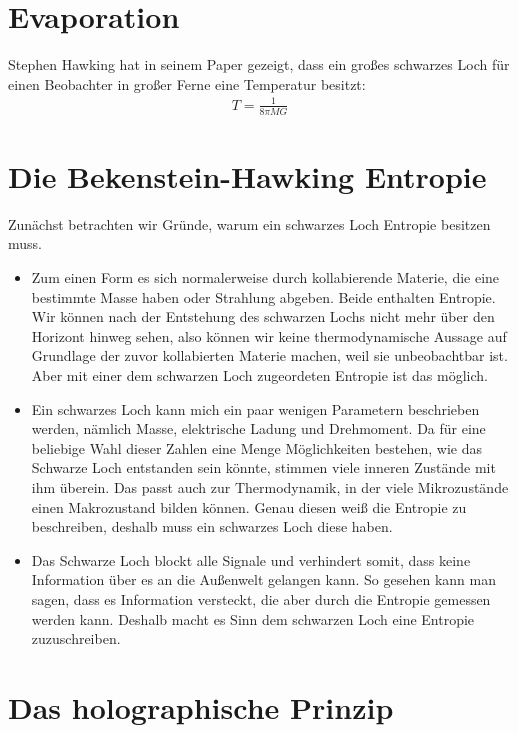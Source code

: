 \documentclass[ngerman]{scrartcl}
\begin{document}
\section{Evaporation}
	Stephen Hawking hat in seinem Paper \cite{ParticleCreation} gezeigt, dass ein großes schwarzes Loch für einen Beobachter in großer Ferne eine Temperatur besitzt:
		\begin{align}
			T = \frac{1}{8 \pi MG}
		\end{align}

\section{Die Bekenstein-Hawking Entropie}
Zunächst betrachten wir Gründe, warum ein schwarzes Loch Entropie besitzen muss. 
	\begin{itemize}
		\item Zum einen Form es sich normalerweise durch kollabierende Materie, die eine 	bestimmte Masse haben oder Strahlung abgeben. Beide enthalten 		Entropie. Wir können nach der Entstehung des schwarzen Lochs nicht mehr über den Horizont hinweg sehen, also können wir keine thermodynamische Aussage auf Grundlage der zuvor kollabierten Materie machen, weil sie unbeobachtbar ist. Aber mit einer dem schwarzen Loch zugeordeten Entropie ist das möglich.
		
		\item Ein schwarzes Loch kann mich ein paar wenigen Parametern beschrieben werden, nämlich Masse, elektrische Ladung und Drehmoment. Da für eine beliebige Wahl dieser Zahlen eine Menge Möglichkeiten bestehen, wie das Schwarze Loch entstanden sein könnte, stimmen viele inneren Zustände mit ihm überein. Das passt auch zur Thermodynamik, in der viele Mikrozustände einen Makrozustand bilden können. Genau diesen weiß die Entropie zu beschreiben, deshalb muss ein schwarzes Loch diese haben. 
		
		\item Das Schwarze Loch blockt alle Signale und verhindert somit, dass keine Information über es an die Außenwelt gelangen kann. So gesehen kann man sagen, dass es Information versteckt, die aber durch die Entropie gemessen werden kann. Deshalb macht es Sinn dem schwarzen Loch eine Entropie zuzuschreiben. 
	\end{itemize}

\section{Das holographische Prinzip}
\end{document}
